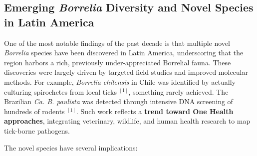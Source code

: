 \documentclass[11pt,letterpaper]{article}
\newcommand{\mycite}[1]{$^{[#1]}$}
\begin{document}
\subsection{Emerging \textit{Borrelia} Diversity and Novel Species in Latin America}
One of the most notable findings of the past decade is that multiple novel \textit{Borrelia} species have been discovered in Latin America, underscoring that the region harbors a rich, previously under-appreciated Borrelial fauna. These discoveries were largely driven by targeted field studies and improved molecular methods. For example, \textit{Borrelia chilensis} in Chile was identified by actually culturing spirochetes from local ticks \mycite{1}, something rarely achieved. The Brazilian \textit{Ca. B. paulista} was detected through intensive DNA screening of hundreds of rodents \mycite{1}. Such work reflects a \textbf{trend toward One Health approaches}, integrating veterinary, wildlife, and human health research to map tick-borne pathogens.

The novel species have several implications:
\end{document}
